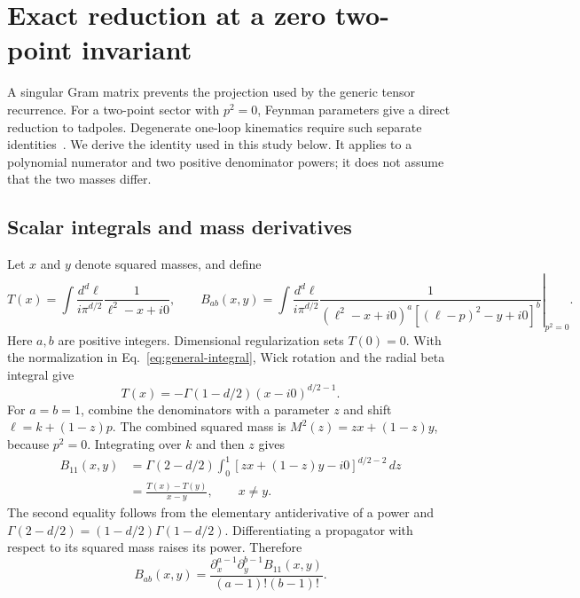 \documentclass[11pt,a4paper]{article}
\begin{document}
\section{Exact reduction at a zero two-point invariant}
\label{notes-light-app:lightlike}
A singular Gram matrix prevents the projection used by the generic tensor recurrence. For a two-point sector with $p^2=0$, Feynman parameters give a direct reduction to tadpoles. Degenerate one-loop kinematics require such separate identities~\cite{DennerDittmaier2006}. We derive the identity used in this study below. It applies to a polynomial numerator and two positive denominator powers; it does not assume that the two masses differ.

\subsection{Scalar integrals and mass derivatives}
Let $x$ and $y$ denote squared masses, and define
\begin{equation}
 T(x)=\int\frac{d^d\ell}{i\pi^{d/2}}\frac{1}{\ell^2-x+i0},\qquad
 B_{ab}(x,y)=\left.\int\frac{d^d\ell}{i\pi^{d/2}}
 \frac{1}{(\ell^2-x+i0)^a[(\ell-p)^2-y+i0]^b}\right|_{p^2=0}.
 \label{notes-light-eq:light-def}
\end{equation}
Here $a,b$ are positive integers. Dimensional regularization sets $T(0)=0$. With the normalization in Eq.~\eqref{eq:general-integral}, Wick rotation and the radial beta integral give~\cite{Weinzierl2022}
\begin{equation}
 T(x)=-\Gamma(1-d/2)(x-i0)^{d/2-1}.
 \label{notes-light-eq:light-tad}
\end{equation}
For $a=b=1$, combine the denominators with a parameter $z$ and shift $\ell=k+(1-z)p$. The combined squared mass is $M^2(z)=zx+(1-z)y$, because $p^2=0$. Integrating over $k$ and then $z$ gives
\begin{align}
 B_{11}(x,y)
 &=\Gamma(2-d/2)\int_0^1 [zx+(1-z)y-i0]^{d/2-2}\,dz\nonumber\\
 &=\frac{T(x)-T(y)}{x-y},\qquad x\ne y.
 \label{notes-light-eq:light-difference}
\end{align}
The second equality follows from the elementary antiderivative of a power and $\Gamma(2-d/2)=(1-d/2)\Gamma(1-d/2)$. Differentiating a propagator with respect to its squared mass raises its power. Therefore
\begin{equation}
 B_{ab}(x,y)=\frac{\partial_x^{a-1}\partial_y^{b-1}B_{11}(x,y)}{(a-1)!(b-1)!}.
 \label{notes-light-eq:light-derivative}
\end{equation}
\end{document}
